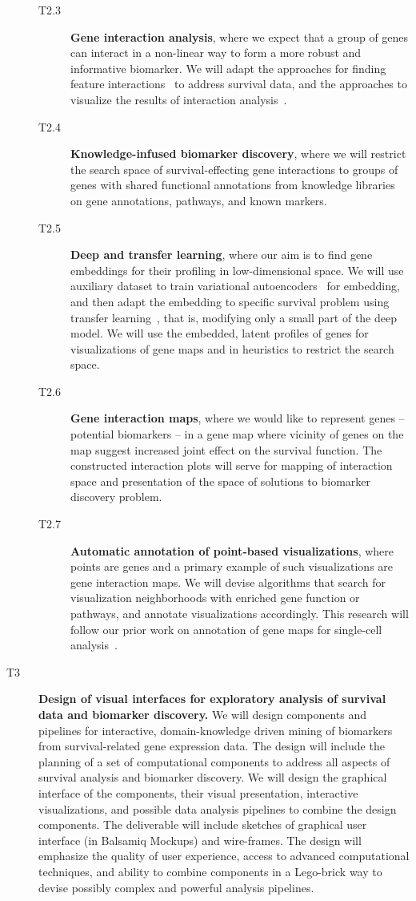 \documentclass[11pt,a4paper]{article}
\renewcommand{\bf}{\textbf}
\begin{document}
\begin{description}
\begin{description}
		\item[T2.3] \bf{Gene interaction analysis}, where we expect that a group of genes can interact in a non-linear way to form a more robust and informative biomarker. We will adapt the approaches for finding feature interactions~\cite{} to address survival data, and the approaches to visualize the results of interaction analysis~\cite{}.
		\item[T2.4] \bf{Knowledge-infused biomarker discovery}, where we will restrict the search space of survival-effecting gene interactions to groups of genes with shared functional annotations from knowledge libraries on gene annotations, pathways, and known markers.
		\item[T2.5] \bf{Deep and transfer learning}, where our aim is to find gene embeddings for their profiling in low-dimensional space. We will use auxiliary dataset to train variational autoencoders~\cite{} for embedding, and then adapt the embedding to specific survival problem using transfer learning~\cite{}, that is, modifying only a small part of the deep model. We will use the embedded, latent profiles of genes for visualizations of gene maps and in heuristics to restrict the search space.
		\item[T2.6] \bf{Gene interaction maps}, where we would like to represent genes -- potential biomarkers -- in a gene map where vicinity of genes on the map suggest increased joint effect on the survival function. The constructed interaction plots will serve for mapping of interaction space and presentation of the space of solutions to biomarker discovery problem.
		\item[T2.7] \bf{Automatic annotation of point-based visualizations}, where points are genes and a primary example of such visualizations are gene interaction maps. We will devise algorithms that search for visualization neighborhoods with enriched gene function or pathways, and annotate visualizations accordingly. This research will follow our prior work on annotation of gene maps for single-cell analysis~\cite{}.
	\end{description}
	\item[T3] \bf{Design of visual interfaces for exploratory analysis of survival data and biomarker discovery.} We will design components and pipelines for interactive, domain-knowledge driven mining of biomarkers from survival-related gene expression data. The design will include the planning of a set of computational components to address all aspects of survival analysis and biomarker discovery. We will design the graphical interface of the components, their visual presentation, interactive visualizations, and possible data analysis pipelines to combine the design components. The deliverable will include sketches of graphical user interface (in Balsamiq Mockups) and wire-frames. The design will emphasize the quality of user experience, access to advanced computational techniques, and ability to combine components in a Lego-brick way to devise possibly complex and powerful analysis pipelines.

\end{description}
\end{document}
